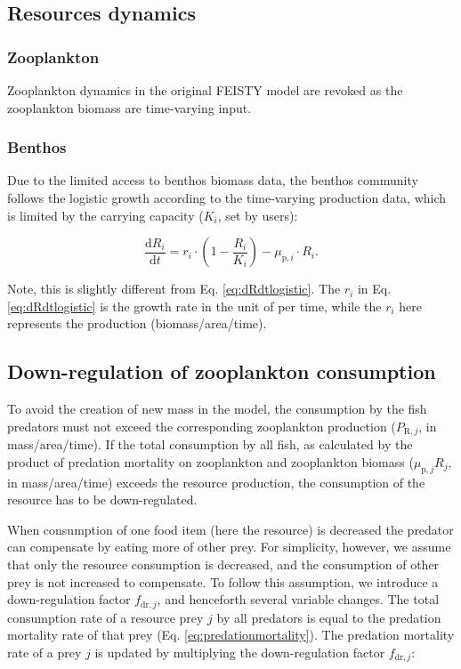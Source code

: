 \documentclass[
]{article}
\begin{document}
\subsection{Resources dynamics}\label{resources-dynamics}

\subsubsection{Zooplankton}\label{zooplankton}

Zooplankton dynamics in the original FEISTY model are revoked as the
zooplankton biomass are time-varying input.

\subsubsection{Benthos}\label{benthos}

Due to the limited access to benthos biomass data, the benthos community
follows the logistic growth according to the time-varying production
data, which is limited by the carrying capacity (\(K_i\), set by users):

\begin{equation}
\frac{\mathrm{d}R_i}{\mathrm{d}t}=r_i \cdot (1-\frac{R_i}{K_i}) - \mu_{\mathrm{p},i} \cdot R_i .
\end{equation}

Note, this is slightly different from Eq. \ref{eq:dRdtlogistic}. The
\(r_i\) in Eq. \ref{eq:dRdtlogistic} is the growth rate in the unit of
per time, while the \(r_i\) here represents the production
(biomass/area/time).

\subsection{Down-regulation of zooplankton
consumption}\label{down-regulation-of-zooplankton-consumption}

To avoid the creation of new mass in the model, the consumption by the
fish predators must not exceed the corresponding zooplankton production
(\(P_{\mathrm{R},j}\), in mass/area/time). If the total consumption by
all fish, as calculated by the product of predation mortality on
zooplankton and zooplankton biomass (\(\mu_{\mathrm{p},j} R_j\), in
mass/area/time) exceeds the resource production, the consumption of the
resource has to be down-regulated.

When consumption of one food item (here the resource) is decreased the
predator can compensate by eating more of other prey. For simplicity,
however, we assume that only the resource consumption is decreased, and
the consumption of other prey is not increased to compensate. To follow
this assumption, we introduce a down-regulation factor
\(f_{\mathrm{dr},j}\), and henceforth several variable changes. The
total consumption rate of a resource prey \(j\) by all predators is
equal to the predation mortality rate of that prey (Eq.
\ref{eq:predationmortality}). The predation mortality rate of a prey
\(j\) is updated by multiplying the down-regulation factor
\(f_{\mathrm{dr},j}\):
\end{document}
